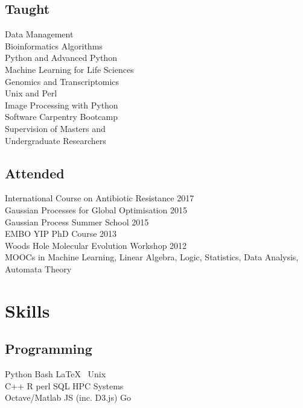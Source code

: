 \documentclass[]{Finlay_Maguire_CV}
\begin{document}
\begin{minipage}[t]{0.33\textwidth}
\subsection{Taught}
Data Management\\
Bioinformatics Algorithms\\
Python and Advanced Python\\
Machine Learning for Life Sciences\\
Genomics and Transcriptomics\\
Unix and Perl\\
Image Processing with Python\\
Software Carpentry Bootcamp\\
Supervision of Masters and \\ Undergraduate Researchers\\
\sectionsep

\subsection{Attended}
International Course on Antibiotic Resistance 2017 \\
Gaussian Processes for Global Optimisation 2015\\
Gaussian Process Summer School 2015\\
EMBO YIP PhD Course 2013\\
Woods Hole Molecular Evolution Workshop 2012\\
MOOCs in Machine Learning, Linear Algebra, 
Logic, Statistics, Data Analysis, Automata Theory\\
\sectionsep


\section{Skills}
\subsection{Programming}
    \textit{}
    Python \textbullet{} Bash \textbullet{}  \LaTeX\ \textbullet{} Unix\\
    \textit{}
    C++ \textbullet{} R \textbullet{} perl \textbullet{} SQL \textbullet{} HPC Systems\\
    \textit{}
    Octave/Matlab \textbullet{} JS (inc. D3.js) \textbullet{} Go\\
\sectionsep

\end{minipage}
\end{document}

